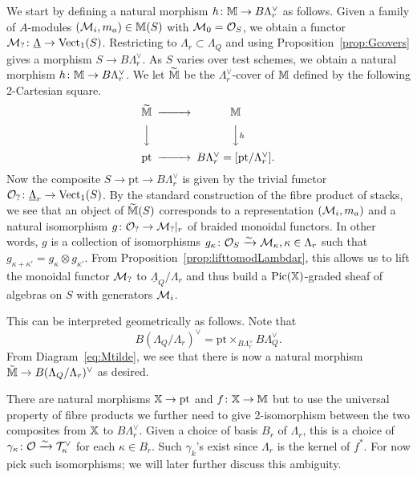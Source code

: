 \documentclass[12pt]{amsart}
\begin{document}
We start by defining a natural morphism $h\colon \mathbb{M} \rightarrow B\Lambda_r^\vee$ as follows. Given a family of $A$-modules $(\mathcal{M}_i,  m_a) \in \mathbb{M}(S)$ with $\mathcal{M}_0 = \mathcal{O}_S$, we obtain a functor $\mathcal{M}_? \colon \underline{\Lambda} \to \operatorname{Vect}_1(S)$. Restricting to $\Lambda_r \subset \Lambda_Q$ and using Proposition~\ref{prop:Gcovers} gives a morphism $S \to B\Lambda_r^{\vee}$. As $S$ varies over test schemes, we obtain a natural morphism $h \colon \mathbb{M} \to B\Lambda_r^{\vee}$. 
We let $\widetilde{\mathbb{M}}$ be the $\Lambda_r^{\vee}$-cover of $\mathbb{M}$ defined by the following 2-Cartesian square.
\begin{equation} \label{eq:Mtilde}
\begin{CD}
\widetilde{\bM} @>>> \bM \\
@VVV @VVhV \\
\text{pt} @>>> B\Lambda_r^{\vee} = [\text{pt}/\Lambda_r^{\vee}].
\end{CD}
\end{equation}
Now the composite $S \rightarrow \text{pt} \rightarrow B\Lambda_r^\vee$
is given by the trivial functor $\mathcal{O}_? \colon \underline{\Lambda}_r \rightarrow \operatorname{Vect}_1(S)$.
By the standard construction of the fibre product of stacks, we see that an object of $\widetilde{\mathbb{M}}(S)$ corresponds to a representation $(\mathcal{M}_i,m_a)$ and a natural isomorphism $g \colon \mathcal{O}_? \rightarrow \mathcal{M}_?|_r$ of braided monoidal functors.
In other words, $g$ is a collection of isomorphisms $g_{\kappa} \colon \mathcal{O}_S \xrightarrow{\sim} \mathcal{M}_{\kappa}, \kappa \in \Lambda_r$ such that $g_{\kappa + \kappa'} = g_{\kappa} \otimes g_{\kappa'}$. From Proposition~\ref{prop:lifttomodLambdar}, this allows us to lift the monoidal functor $\mathcal{M}_?$ to $\underline{\Lambda}_Q/\Lambda_r$ and thus build a $\operatorname{Pic}(\mathbb{X})$-graded sheaf of algebras on $S$ with generators $\mathcal{M}_i$. 

This can be interpreted geometrically as follows. Note that 
$$ B(\Lambda_Q/\Lambda_r)^{\vee} = \text{pt} \times_{B\Lambda_r^{\vee}} B\Lambda_Q^{\vee}.$$
From Diagram~\ref{eq:Mtilde}, we see that there is now a natural morphism $\tilde{\mathbb{M}} \to B(\Lambda_Q/\Lambda_r)^{\vee}$ as desired. 

There are natural morphisms $\mathbb{X} \rightarrow \text{pt}$ and $f \colon \mathbb{X} \rightarrow \mathbb{M}$ but to use the universal property of fibre products we further need to give 2-isomorphism between the two composites from $\mathbb{X}$ to $B\Lambda_r^{\vee}$.
Given a choice of basis $B_r$ of $\Lambda_r$, this is a choice of $\gamma_{\kappa} \colon \mathcal{O} \xrightarrow{\sim} \mathcal{T}_{\kappa}^\vee$ for each $\kappa \in B_r$.
Such $\gamma_k$'s exist since $\Lambda_r$ is the kernel of $f^*$.
For now pick such isomorphisms; we will later further discuss this ambiguity.
\end{document}
